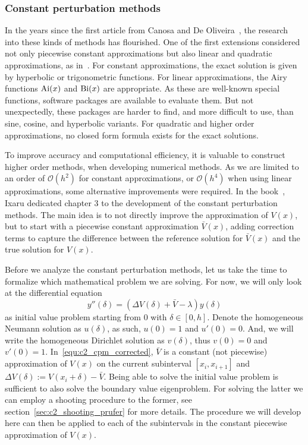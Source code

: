 \subsubsection{Constant perturbation methods}

In the years since the first article from Canosa and De Oliveira~\cite{canosa_new_1970}, the research into these kinds of methods has flourished. One of the first extensions considered not only piecewise constant approximations but also linear and quadratic approximations, as in~\cite{pruess_estimating_1973}. For constant approximations, the exact solution is given by hyperbolic or trigonometric functions. For linear approximations, the Airy functions $\operatorname{Ai}(x)$ and $\operatorname{Bi}(x)$ are appropriate. As these are well-known special functions, software packages are available to evaluate them. But not unexpectedly, these packages are harder to find, and more difficult to use, than sine, cosine, and hyperbolic variants. For quadratic and higher order approximations, no closed form formula exists for the exact solutions.

To improve accuracy and computational efficiency, it is valuable to construct higher order methods, when developing numerical methods. As we are limited to an order of $\mathcal{O}(h^2)$ for constant approximations, or $\mathcal{O}(h^4)$ when using linear approximations, some alternative improvements were required. In the book~\cite{ixaru_numerical_1984}, Ixaru dedicated chapter 3 to the development of the constant perturbation methods. The main idea is to not directly improve the approximation of $V(x)$, but to start with a piecewise constant approximation $\bar{V}(x)$, adding correction terms to capture the difference between the reference solution for $\bar{V}(x)$ and the true solution for $V(x)$.

Before we analyze the constant perturbation methods, let us take the time to formalize which mathematical problem we are solving. For now, we will only look at the differential equation
\begin{equation}\label{equ:c2_cpm_corrected}
    y''(\delta) = (\Delta V(\delta) + \bar{V} - \lambda) y(\delta)
\end{equation}
as initial value problem starting from $0$ with $\delta \in [0, h]$. Denote the homogeneous Neumann solution as $u(\delta)$, as such, $u(0) = 1$ and $u'(0) = 0$. And, we will write the homogeneous Dirichlet solution as $v(\delta)$, thus $v(0) = 0$ and $v'(0)=1$. In~\eqref{equ:c2_cpm_corrected}, $\bar{V}$ is a constant (not piecewise) approximation of $V(x)$ on the current subinterval $[x_i, x_{i+1}]$ and $\Delta V(\delta) := V(x_i + \delta) - \bar{V}$. Being able to solve the initial value problem is sufficient to also solve the boundary value eigenproblem. For solving the latter we can employ a shooting procedure to the former, see section~\ref{sec:c2_shooting_prufer} for more details. The procedure we will develop here can then be applied to each of the subintervals in the constant piecewise approximation of $V(x)$.

